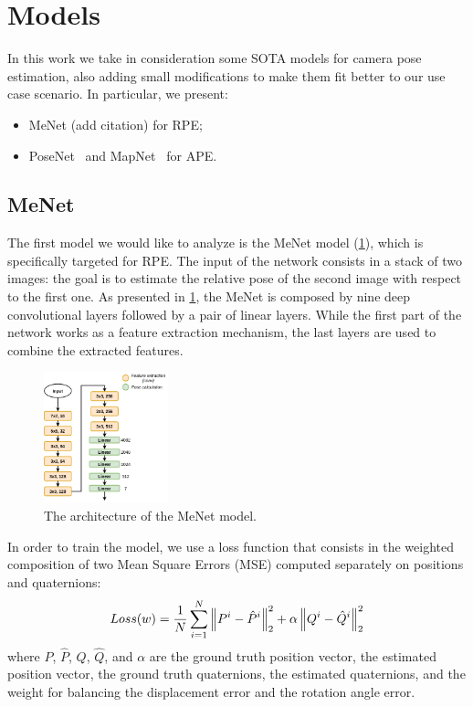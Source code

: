 \section{Models}
In this work we take in consideration some SOTA models for camera pose estimation, also adding small modifications to make them fit better to our use case scenario.
In particular, we present:
\begin{itemize}
    \item MeNet (add citation) for RPE;
    \item PoseNet~\cite{9348762} and MapNet~\cite{DBLP:journals/corr/abs-1712-03342} for APE.
\end{itemize}

\subsection{MeNet}
The first model we would like to analyze is the MeNet model (\cref{fig:menet-structure}), which is specifically targeted for RPE.
The input of the network consists in a stack of two images: the goal is to estimate the relative pose of the second image with respect to the first one.
As presented in \cref{fig:menet-structure}, the MeNet is composed by nine deep convolutional layers followed by a pair of linear layers. While the first part of the network works as a feature extraction mechanism, the last layers are used to combine the extracted features.
\begin{figure}
    \begin{center}
        \includegraphics[width=0.32\textwidth]{./imgs/menet_structure.png}
    \end{center}
    \caption{The architecture of the MeNet model.}
    \label{fig:menet-structure}
\end{figure}

In order to train the model, we use a loss function that consists in the weighted composition of two Mean Square Errors (MSE) computed separately on positions and quaternions:
\begin{equation}
    Loss(w) = \frac{1}{N} \sum\limits_{i=1}^N \norm{P^i - \hat{P}^i}^2_2 + \alpha\norm{Q^i - \hat{Q}^i}^2_2
    \label{eq:menet-loss}
\end{equation}
where $P$, $\hat{P}$, $Q$, $\hat{Q}$, and $\alpha$ are the ground truth position vector, the estimated position vector, the ground truth quaternions, the estimated quaternions, and the weight for balancing the displacement error and the rotation angle error.

